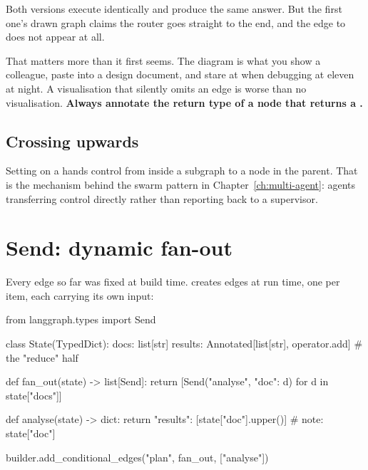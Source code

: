 \begin{warning}
Both versions execute identically and produce the same answer. But the first
one's drawn graph claims the router goes straight to the end, and the edge to
 does not appear at all.

That matters more than it first seems. The diagram is what you show a colleague,
paste into a design document, and stare at when debugging at eleven at night. A
visualisation that silently omits an edge is worse than no visualisation.
\textbf{Always annotate the return type of a node that returns a .}
\end{warning}

\subsection{Crossing upwards}
\label{sec:command-parent}

Setting  on a  hands control from inside
a subgraph to a node in the parent. That is the mechanism behind the swarm
pattern in Chapter~\ref{ch:multi-agent}: agents transferring control directly
rather than reporting back to a supervisor.

\section{Send: dynamic fan-out}
\label{sec:send}

Every edge so far was fixed at build time.  creates edges at run time,
one per item, each carrying its own input:

\begin{python}[caption={Map-reduce over a list}, label={lst:send}]
from langgraph.types import Send


class State(TypedDict):
    docs: list[str]
    results: Annotated[list[str], operator.add]   # the "reduce" half


def fan_out(state) -> list[Send]:
    return [Send("analyse", {"doc": d}) for d in state["docs"]]


def analyse(state) -> dict:
    return {"results": [state["doc"].upper()]}    # note: state["doc"]


builder.add_conditional_edges("plan", fan_out, ["analyse"])
\end{python}

